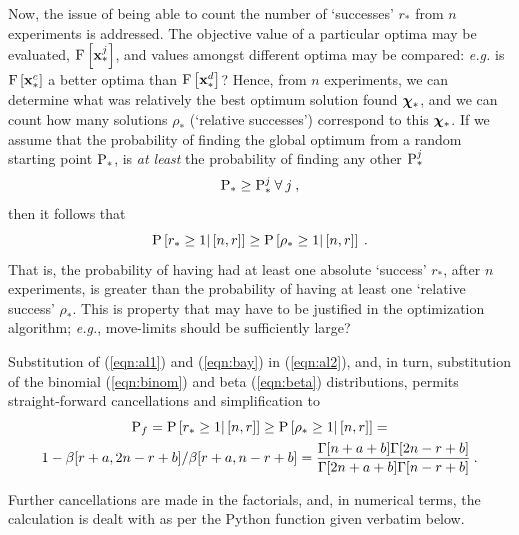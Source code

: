 \documentclass[11pt]{article}
\begin{document}
Now, the issue of being able to count the number of `successes' $r_\ast$ from $n$ experiments is addressed. The objective value of a particular optima may be evaluated, $\F \left[ \bx^j_\ast \right]$, and values amongst different optima may be compared: \emph{e.g.} is $\F \left[ \bx^c_\ast \right]$ a better optima than $\F \left[ \bx^d_\ast \right]$? Hence, from $n$ experiments, we can determine what was relatively the best optimum solution found $\bchi_\ast$, and we can count how many solutions $\rho_\ast$ (`relative successes') correspond to this $\bchi_\ast$. If we assume that the probability of finding the global optimum from a random starting point $\P_\ast$, is \emph{at least} the probability of finding any other $\P^j_\ast$
\begin{equation}
\P_\ast \ge \P^j_\ast \: \forall \: j \:,
\end{equation}
then it follows that
\begin{equation}
\P \left[ r_\ast \ge 1 | \left[ n, r \right] \right] \ge \P \left[ \rho_\ast \ge 1 | \left[ n, r \right] \right] \: .
\end{equation}
That is, the probability of having had at least one absolute `success' $r_\ast$, after $n$ experiments, is greater than the probability of having at least one `relative success' $\rho_\ast$. This is property that may have to be justified in the optimization algorithm; \emph{e.g.}, move-limits should be sufficiently large?

Substitution of (\ref{eqn:al1}) and (\ref{eqn:bay}) in (\ref{eqn:al2}), and, in turn, substitution of the binomial (\ref{eqn:binom}) and beta (\ref{eqn:beta}) distributions, permits straight-forward cancellations and simplification \cite{snyman1987} to
\begin{multline}
\label{eqn:res}
\P_f = \P \left[ r_\ast \ge 1 | \left[ n, r \right] \right]  \ge \P \left[ \rho_\ast \ge 1 | \left[ n, r \right] \right] = \\  1 - \beta[r+a,2n-r+b]/\beta[r +a,n-r+b] = \frac{\Gamma[n+a+b]\Gamma[2n-r+b]}{\Gamma[2n+a+b]\Gamma[n-r+b]}\:.
\end{multline}

Further cancellations are made in the factorials, and, in numerical terms, the calculation is dealt with as per the Python function given verbatim below. 
\end{document}
